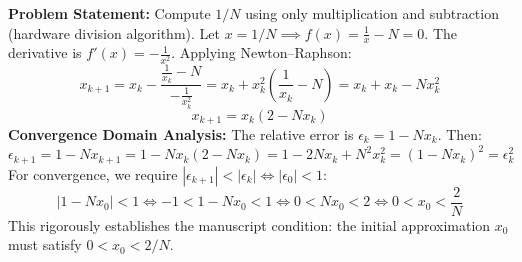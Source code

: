 \begin{examplebox}
\textbf{Problem Statement:} Compute $1/N$ using only multiplication and subtraction (hardware division algorithm).
Let $x = 1/N \implies f(x) = \frac{1}{x} - N = 0$.
The derivative is $f'(x) = -\frac{1}{x^2}$.
Applying Newton--Raphson:
\begin{equation}
    x_{k+1} = x_k - \frac{\frac{1}{x_k} - N}{-\frac{1}{x_k^2}} = x_k + x_k^2\left(\frac{1}{x_k} - N\right) = x_k + x_k - N x_k^2
\end{equation}
\begin{equation}
    \boxed{x_{k+1} = x_k(2 - N x_k)}
\end{equation}
\textbf{Convergence Domain Analysis:}
The relative error is $\epsilon_k = 1 - N x_k$. Then:
\begin{equation}
    \epsilon_{k+1} = 1 - N x_{k+1} = 1 - N x_k(2 - N x_k) = 1 - 2 N x_k + N^2 x_k^2 = (1 - N x_k)^2 = \epsilon_k^2
\end{equation}
For convergence, we require $|\epsilon_{k+1}| < |\epsilon_k| \iff |\epsilon_0| < 1$:
\begin{equation}
    |1 - N x_0| < 1 \iff -1 < 1 - N x_0 < 1 \iff 0 < N x_0 < 2 \iff \boxed{0 < x_0 < \frac{2}{N}}
\end{equation}
This rigorously establishes the manuscript condition: the initial approximation $x_0$ must satisfy $0 < x_0 < 2/N$.
\end{examplebox}

\begin{center}
\end{center}


